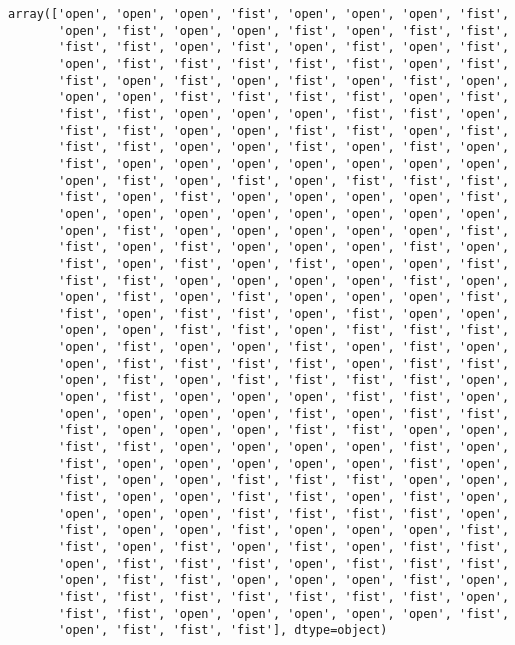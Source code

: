 \documentclass[11pt]{article}
\makeatletter
\newcommand{\boxspacing}{\kern\kvtcb@left@rule\kern\kvtcb@boxsep}
\newcommand{\prompt}[4]{
        {\ttfamily\llap{{\color{#2}[#3]:\hspace{3pt}#4}}\vspace{-\baselineskip}}
    }
\makeatother
\begin{document}
            \begin{tcolorbox}[breakable, size=fbox, boxrule=.5pt, pad at break*=1mm, opacityfill=0]
\prompt{Out}{outcolor}{64}{\boxspacing}
\begin{Verbatim}[commandchars=\\\{\}]
array(['open', 'open', 'open', 'fist', 'open', 'open', 'open', 'fist',
       'open', 'fist', 'open', 'open', 'fist', 'open', 'fist', 'fist',
       'fist', 'fist', 'open', 'fist', 'open', 'fist', 'open', 'fist',
       'open', 'fist', 'fist', 'fist', 'fist', 'fist', 'open', 'fist',
       'fist', 'open', 'fist', 'open', 'fist', 'open', 'fist', 'open',
       'open', 'open', 'fist', 'fist', 'fist', 'fist', 'open', 'fist',
       'fist', 'fist', 'open', 'open', 'open', 'fist', 'fist', 'open',
       'fist', 'fist', 'open', 'open', 'fist', 'fist', 'open', 'fist',
       'fist', 'fist', 'open', 'open', 'fist', 'open', 'fist', 'open',
       'fist', 'open', 'open', 'open', 'open', 'open', 'open', 'open',
       'open', 'fist', 'open', 'fist', 'open', 'fist', 'fist', 'fist',
       'fist', 'open', 'fist', 'open', 'open', 'open', 'open', 'fist',
       'open', 'open', 'open', 'open', 'open', 'open', 'open', 'open',
       'open', 'fist', 'open', 'open', 'open', 'open', 'open', 'fist',
       'fist', 'open', 'fist', 'open', 'open', 'open', 'fist', 'open',
       'fist', 'open', 'fist', 'open', 'fist', 'open', 'open', 'fist',
       'fist', 'fist', 'open', 'open', 'open', 'open', 'fist', 'open',
       'open', 'fist', 'open', 'fist', 'open', 'open', 'open', 'fist',
       'fist', 'open', 'fist', 'fist', 'open', 'fist', 'open', 'open',
       'open', 'open', 'fist', 'fist', 'open', 'fist', 'fist', 'fist',
       'open', 'fist', 'open', 'open', 'fist', 'open', 'fist', 'open',
       'open', 'fist', 'fist', 'fist', 'fist', 'open', 'fist', 'fist',
       'open', 'fist', 'open', 'fist', 'fist', 'fist', 'fist', 'open',
       'open', 'fist', 'open', 'open', 'open', 'fist', 'fist', 'open',
       'open', 'open', 'open', 'open', 'fist', 'open', 'fist', 'fist',
       'fist', 'open', 'open', 'open', 'fist', 'fist', 'open', 'open',
       'fist', 'fist', 'open', 'open', 'open', 'open', 'fist', 'open',
       'fist', 'open', 'open', 'open', 'open', 'open', 'fist', 'open',
       'fist', 'open', 'open', 'fist', 'fist', 'fist', 'open', 'open',
       'fist', 'open', 'open', 'fist', 'fist', 'open', 'fist', 'open',
       'open', 'open', 'open', 'fist', 'fist', 'fist', 'fist', 'open',
       'fist', 'open', 'open', 'fist', 'open', 'open', 'open', 'fist',
       'fist', 'open', 'fist', 'open', 'fist', 'open', 'fist', 'fist',
       'open', 'fist', 'fist', 'fist', 'open', 'fist', 'fist', 'fist',
       'open', 'fist', 'fist', 'open', 'open', 'open', 'fist', 'open',
       'fist', 'fist', 'fist', 'fist', 'fist', 'fist', 'fist', 'open',
       'fist', 'fist', 'open', 'open', 'open', 'open', 'open', 'fist',
       'open', 'fist', 'fist', 'fist'], dtype=object)
\end{Verbatim}
\end{tcolorbox}
        
\end{document}
